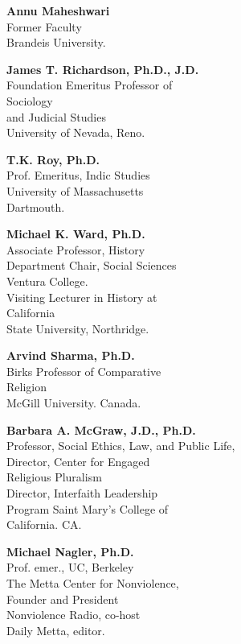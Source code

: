 \begin{multicols}{2}
\begin{trivlist}
\item \textbf{Annu Maheshwari}\\ 
Former Faculty\\
Brandeis University.
 
\item \textbf{James T. Richardson, Ph.D., J.D.}\\ 
Foundation Emeritus Professor of\\ Sociology\\ 
and Judicial Studies\\
University of Nevada, Reno.
 
\item \textbf{T.K. Roy, Ph.D.}\\ 
Prof. Emeritus, Indic Studies\\
University of Massachusetts\\
Dartmouth.
 
\item \textbf{Michael K. Ward, Ph.D.} \\
Associate Professor, History\\
Department Chair, Social Sciences\\
Ventura College.\\[2pt]
Visiting Lecturer in History at\\ California\\
State University, Northridge. 

\item \textbf{Arvind Sharma, Ph.D.}\\ 
Birks Professor of Comparative\\ Religion\\ 
McGill University. Canada.
 
\item \textbf{Barbara A. McGraw, J.D., Ph.D.}\\ 
Professor, Social Ethics, Law, and Public Life,\\[2pt]
Director, Center for Engaged\\ Religious Pluralism\\[2pt]
Director, Interfaith Leadership\\ Program
Saint Mary’s College of\\ California. CA.
 

\item \textbf{Michael Nagler, Ph.D.}\\
Prof. emer., UC, Berkeley\\
The Metta Center for Nonviolence,\\ 
Founder and President\\
Nonviolence Radio, co-host\\ 
Daily Metta, editor.
 

\end{trivlist}
\end{multicols}
